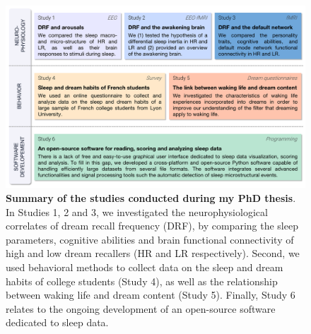 \begin{figure}[htb]
	\includegraphics[width=\textwidth]{Fig/Intro/Intro_Problematics/Intro_Problematics.png}
	\caption[Summary of the studies conducted during my PhD thesis]{\textbf{Summary of the studies conducted during my PhD thesis}. In Studies 1, 2 and 3, we investigated the neurophysiological correlates of dream recall frequency (DRF), by comparing the sleep parameters, cognitive abilities and brain functional connectivity of high and low dream recallers (HR and LR respectively). Second, we used behavioral methods to collect data on the sleep and dream habits of college students (Study 4), as well as the relationship between waking life and dream content (Study 5). Finally, Study 6 relates to the ongoing development of an open-source software dedicated to sleep data.}
	\label{fig:intro:problematics-summary}
\end{figure}
